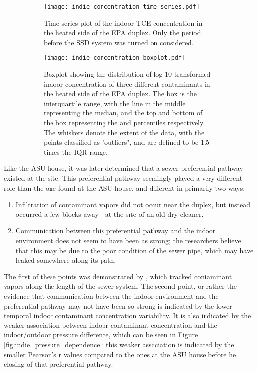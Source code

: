 \begin{figure}[htb!]
  \centering
  \begin{subfigure}[b]{\textwidth}
    \centering
    \texttt{[image: indie\_concentration\_time\_series.pdf]}
    \caption{Time series plot of the indoor TCE concentration in the heated side of the EPA duplex. Only the period before the SSD system was turned on considered.}
    \label{fig:indie_time_series}
  \end{subfigure}
  \begin{subfigure}[b]{\textwidth}
    \centering
    \texttt{[image: indie\_concentration\_boxplot.pdf]}
    \caption{Boxplot showing the distribution of log-10 transformed indoor concentration of three different contaminants in the heated side of the EPA duplex. The box is the interquartile range, with the line in the middle representing the median, and the top and bottom of the box representing the  and  percentiles respectively. The whiskers denote the extent of the data, with the points classified as "outliers", and are defined to be 1.5 times the IQR range.}
    \label{fig:indie_boxplot}
  \end{subfigure}
  \caption{}
  \label{fig:indie_variability}
\end{figure}

Like the ASU house, it was later determined that a sewer preferential pathway existed at the site.
This preferential pathway seemingly played a very different role than the one found at the ASU house, and different in primarily two ways:
\begin{enumerate}
  \item Infiltration of contaminant vapors did not occur near the duplex, but instead occurred a few blocks away - at the site of an old dry cleaner.
  \item Communication between this preferential pathway and the indoor environment does not seem to have been as strong; the researchers believe that this may be due to the poor condition of the sewer pipe, which may have leaked somewhere along its path.
\end{enumerate}
The first of these points was demonstrated by \citeauthor{mchugh_evidence_2017}\cite{mchugh_evidence_2017}, which tracked contaminant vapors along the length of the sewer system.
The second point, or rather the evidence that communication between the indoor environment and the preferential pathway may not have been so strong is indicated by the lower temporal indoor contaminant concentration variability.
It is also indicated by the weaker association between indoor contaminant concentration and the indoor/outdoor pressure difference, which can be seen in Figure \ref{fig:indie_pressure_dependence}; this weaker association is indicated by the smaller Pearson's r values compared to the ones at the ASU house before he closing of that preferential pathway.\par


